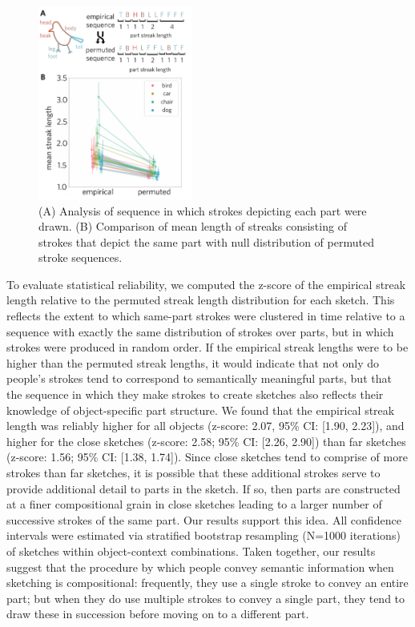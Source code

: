 \documentclass[10pt,letterpaper]{article}
\newcommand{\kushin}[1]{{\color{orange}{[kushin: #1]}}}
\begin{document}
\begin{figure}[ht]
\centering
\includegraphics[width=0.45\textwidth]{figures/6_part_sequence.pdf}
\caption{(A) Analysis of sequence in which strokes depicting each part were drawn. (B) Comparison of mean length of streaks consisting of strokes that depict the same part with null distribution of permuted stroke sequences.}
\label{stroke_sequence_fig}
\end{figure}


To evaluate statistical reliability, we computed the z-score of the empirical streak length relative to the permuted streak length distribution for each sketch. 
This reflects the extent to which same-part strokes were clustered in time relative to a sequence with exactly the same distribution of strokes over parts, but in which strokes were produced in random order. If the empirical streak lengths were to be higher than the permuted streak lengths, it would indicate that not only do people's strokes tend to correspond to semantically meaningful parts, but that the sequence in which they make strokes to create sketches also reflects their knowledge of object-specific part structure. 
We found that the empirical streak length was reliably higher for all objects (z-score: 2.07, 95\% CI: [1.90, 2.23]), and higher for the close sketches (z-score: 2.58; 95\% CI: [2.26, 2.90]) than far sketches (z-score: 1.56; 95\% CI: [1.38, 1.74]).
Since close sketches tend to comprise of more strokes than far sketches, it is possible that these additional strokes serve to provide additional detail to parts in the sketch. If so, then parts are constructed at a finer compositional grain in close sketches \kushin{might work on wording here; feel like there's a missing link}
leading to a larger number of successive strokes of the same part. Our results support this idea.
All confidence intervals were estimated via stratified bootstrap resampling (N=1000 iterations) of sketches within object-context combinations.
Taken together, our results suggest that the procedure by which people convey semantic information when sketching is compositional: frequently, they use a single stroke to convey an entire part; but when they do use multiple strokes to convey a single part, they tend to draw these in succession before moving on to a different part. 
\end{document}
